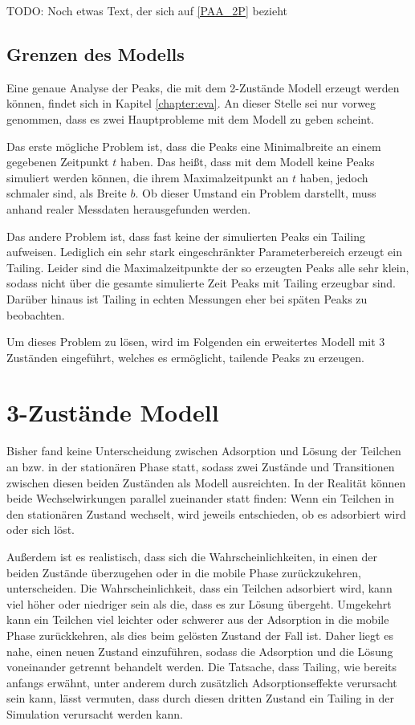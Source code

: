 TODO: Noch etwas Text, der sich auf \ref{PAA_2P} bezieht

\subsection{Grenzen des Modells}
Eine genaue Analyse der Peaks, die mit dem 2-Zustände Modell erzeugt werden können, findet sich in Kapitel \ref{chapter:eva}. An dieser Stelle sei nur vorweg genommen, dass es zwei Hauptprobleme mit dem Modell zu geben scheint. 

Das erste mögliche Problem ist, dass die Peaks eine Minimalbreite an einem gegebenen Zeitpunkt $t$ haben. Das heißt, dass mit dem Modell keine Peaks simuliert werden können, die ihrem Maximalzeitpunkt an $t$ haben, jedoch schmaler sind, als Breite $b$. Ob dieser Umstand ein Problem darstellt, muss anhand realer Messdaten herausgefunden werden.

Das andere Problem ist, dass fast keine der simulierten Peaks ein Tailing aufweisen. Lediglich ein sehr stark eingeschränkter Parameterbereich erzeugt ein Tailing. Leider sind die Maximalzeitpunkte der so erzeugten Peaks alle sehr klein, sodass nicht über die gesamte simulierte Zeit Peaks mit Tailing erzeugbar sind. Darüber hinaus ist Tailing in echten Messungen eher bei späten Peaks zu beobachten.

Um dieses Problem zu lösen, wird im Folgenden ein erweitertes Modell mit 3 Zuständen eingeführt, welches es ermöglicht, tailende Peaks zu erzeugen.


\section{3-Zustände Modell} 
\label{chapter:mod:3s}


Bisher fand keine Unterscheidung zwischen Adsorption und Lösung der Teilchen an bzw. in der stationären Phase statt, sodass zwei Zustände und Transitionen zwischen diesen beiden Zuständen als Modell ausreichten. In der Realität können beide Wechselwirkungen parallel zueinander statt finden: Wenn ein Teilchen in den stationären Zustand wechselt, wird jeweils entschieden, ob es adsorbiert wird oder sich löst.

Außerdem ist es realistisch, dass sich die Wahrscheinlichkeiten, in einen der beiden Zustände überzugehen oder in die mobile Phase zurückzukehren, unterscheiden. Die Wahrscheinlichkeit, dass ein Teilchen adsorbiert wird, kann viel höher oder niedriger sein als die, dass es zur Lösung übergeht. Umgekehrt kann ein Teilchen viel leichter oder schwerer aus der Adsorption in die mobile Phase zurückkehren, als dies beim gelösten Zustand der Fall ist. Daher liegt es nahe, einen neuen Zustand einzuführen, sodass die Adsorption und die Lösung voneinander getrennt behandelt werden. Die Tatsache, dass Tailing, wie bereits anfangs erwähnt, unter anderem durch zusätzlich Adsorptionseffekte verursacht sein kann, lässt vermuten, dass durch diesen dritten Zustand ein Tailing in der Simulation verursacht werden kann. 
 
